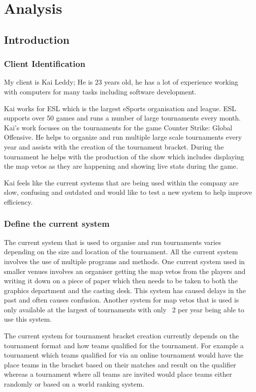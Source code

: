 \chapter{Analysis}

\section{Introduction}
 
\subsection{Client Identification}
My client is Kai Leddy; He is 23 years old, he has a lot of experience working with computers for many tasks including software development.\par
Kai works for ESL which is the largest eSports organisation and league. ESL supports over 50 games and runs a number of large tournaments every month. Kai's work focuses on the tournaments for the game Counter Strike: Global Offensive. He helps to organize and run multiple large scale tournaments every year and assists with the creation of the tournament bracket. During the tournament he helps with the production of the show which includes displaying the map vetos as they are happening and showing live stats during the game.\par
Kai feels like the current systems that are being used within the company are slow, confusing and outdated and would like to test a new system to help improve efficiency.

\subsection{Define the current system}
The current system that is used to organise and run tournaments varies depending on the size and location of the tournament. All the current system involves the use of multiple programs and methods. One current system used in smaller venues involves an organiser getting the map vetos from the players and writing it down on a piece of paper which then needs to be taken to both the graphics department and the casting desk. This system has caused delays in the past and often causes confusion. Another system for map vetos that is used is only available at the largest of tournaments with only ~2 per year being able to use this system.\par
The current system for tournament bracket creation currently depends on the tournament format and how teams qualified for the tournament. For example a tournament which teams qualified for via an online tournament would have the place teams in the bracket based on their matches and result on the qualifier whereas a tournament where all teams are invited would place teams either randomly or based on a world ranking system.

